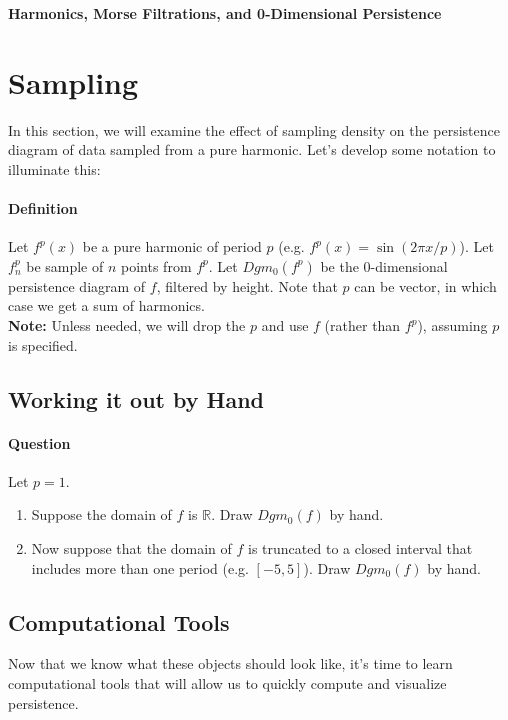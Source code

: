 \documentclass[12pt,twoside]{article}
\newcommand{\defn}{\paragraph*{Definition}}
\newcommand{\qn}{\paragraph*{Question}}
\newcommand{\dsst}{\displaystyle}
\begin{document}
\begin{center}
{\large\textbf{Harmonics, Morse Filtrations, and 0-Dimensional Persistence}}   
\end{center}

\section{Sampling}

In this section, we will examine the effect of sampling density on the persistence diagram of data sampled from a pure harmonic.  Let's develop some notation to illuminate this:

\defn Let $f^p(x)$ be a pure harmonic of period $p$ (e.g. $f^p(x)=\sin(2\pi x/p )$).  Let $f^p_n$ be sample of $n$ points from $f^p$.  Let $Dgm_0(f^p)$ be the 0-dimensional persistence diagram of $f$, filtered by height.  Note that $p$ can be vector, in which case we get a sum of harmonics.\\

\textbf{Note:} Unless needed, we will drop the $p$ and use $f$ (rather than $f^p$), assuming $p$ is specified.

\subsection{Working it out by Hand}
\label{sect:hand}

\qn Let $p=1$.  \begin{enumerate}

   
   \item Suppose the domain of $f$ is $\mathbb{R}$.  Draw $Dgm_0(f)$ by hand.\vfill
   \item \label{qn:truncint} Now suppose that the domain of $f$ is truncated to a closed interval that includes more than one period (e.g. $[-5,5]$).  Draw $Dgm_0(f)$ by hand.\vfill
\end{enumerate}

\pagebreak

\subsection{Computational Tools}
Now that we know what these objects should look like, it's time to learn computational tools that will allow us to quickly compute and visualize persistence.\\
\end{document}
